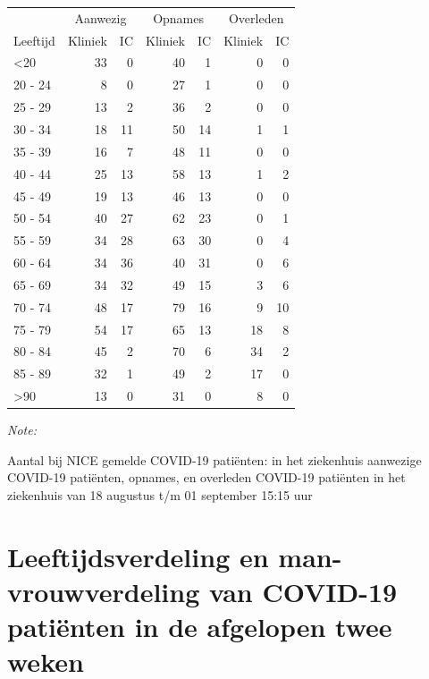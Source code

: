 \documentclass[
  english,
  man,floatsintext]{apa6}
\begin{document}
\begin{table}
\centering\begingroup\fontsize{10}{12}\selectfont

\begin{threeparttable}
\begin{tabular}{lrrrrrr}
\toprule
\multicolumn{1}{c}{ } & \multicolumn{2}{c}{Aanwezig} & \multicolumn{2}{c}{Opnames} & \multicolumn{2}{c}{Overleden} \\
\cmidrule(l{3pt}r{3pt}){2-3} \cmidrule(l{3pt}r{3pt}){4-5} \cmidrule(l{3pt}r{3pt}){6-7}
Leeftijd & Kliniek & IC & Kliniek & IC & Kliniek & IC\\
\midrule
<20 & 33 & 0 & 40 & 1 & 0 & 0\\
20 - 24 & 8 & 0 & 27 & 1 & 0 & 0\\
25 - 29 & 13 & 2 & 36 & 2 & 0 & 0\\
30 - 34 & 18 & 11 & 50 & 14 & 1 & 1\\
35 - 39 & 16 & 7 & 48 & 11 & 0 & 0\\
40 - 44 & 25 & 13 & 58 & 13 & 1 & 2\\
45 - 49 & 19 & 13 & 46 & 13 & 0 & 0\\
50 - 54 & 40 & 27 & 62 & 23 & 0 & 1\\
55 - 59 & 34 & 28 & 63 & 30 & 0 & 4\\
60 - 64 & 34 & 36 & 40 & 31 & 0 & 6\\
65 - 69 & 34 & 32 & 49 & 15 & 3 & 6\\
70 - 74 & 48 & 17 & 79 & 16 & 9 & 10\\
75 - 79 & 54 & 17 & 65 & 13 & 18 & 8\\
80 - 84 & 45 & 2 & 70 & 6 & 34 & 2\\
85 - 89 & 32 & 1 & 49 & 2 & 17 & 0\\
>90 & 13 & 0 & 31 & 0 & 8 & 0\\
\bottomrule
\end{tabular}
\begin{tablenotes}
\item \textit{Note: } 
\item Aantal bij NICE gemelde COVID-19 patiënten: in het ziekenhuis aanwezige COVID-19 patiënten, opnames, en overleden COVID-19 patiënten in het ziekenhuis van 18 augustus t/m 01 september 15:15 uur
\end{tablenotes}
\end{threeparttable}
\endgroup{}
\end{table}

\newpage

\hypertarget{leeftijdsverdeling-en-man-vrouwverdeling-van-covid-19-patiuxebnten-in-de-afgelopen-twee-weken}{%
\section{Leeftijdsverdeling en man-vrouwverdeling van COVID-19 patiënten in de afgelopen twee weken}\label{leeftijdsverdeling-en-man-vrouwverdeling-van-covid-19-patiuxebnten-in-de-afgelopen-twee-weken}}
\end{document}
